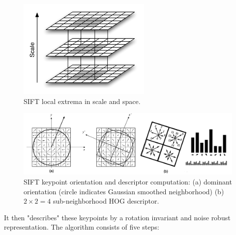 \begin{figure}
    \centering
    \includegraphics[width=.5\linewidth,keepaspectratio]{figures/sift/sift_extrema.png}
    \caption{SIFT local extrema in scale and space.}
    \label{fig:sift_extrema}
\end{figure}
\begin{figure}
    \centering
    \includegraphics[width=\linewidth,keepaspectratio]{figures/sift/sift_descriptor.png}
    \caption{SIFT keypoint orientation and descriptor computation: (a) dominant orientation (circle indicates Gaussian smoothed neighborhood) (b) $2 \times 2 = 4$ sub-neighborhood HOG descriptor\cite{lowe2004distinctive}.}
    \label{fig:sift_descriptor}
\end{figure}
%
It then "describes" these keypoints by a rotation invariant and noise robust representation.
%
The algorithm consists of five steps:
